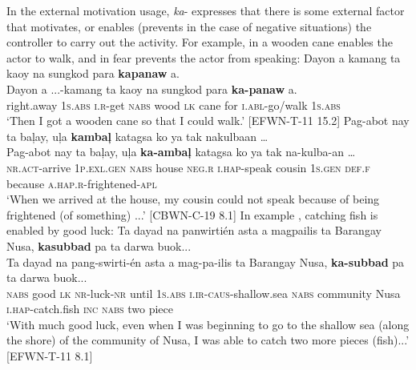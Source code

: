 In the external motivation usage, \textit{ka}- expresses that there is some external factor that motivates, or enables (prevents in the case of negative situations) the controller to carry out the activity. For example, in  a wooden cane enables the actor to walk, and in  fear prevents the actor from speaking: 
\ea
\label{bkm:Ref389056631}
Dayon  a   kamang   ta  kaoy  na  sungkod para  \textbf{kapanaw}  a. \\\smallskip
 \gll Dayon  a   ...-kamang\footnotemark{}   ta  kaoy  na  sungkod para  \textbf{ka-panaw}  a. \\
right.away  1\textsc{s.abs}  \textsc{i.r}-get  \textsc{nabs}  wood  \textsc{lk}  cane
for \textsc{i.abl}-go/walk  1\textsc{s.abs} \\
\glt `Then I got a wooden cane so that I could walk.’ [EFWN-T-11 15.2]
\z
\ea
\label{bkm:Ref396746244}
Pag-abot  nay  ta  baļay,  uļa  \textbf{kambaļ}  katagsa  ko ya tak  nakulbaan … \\\smallskip
 \gll Pag-abot  nay  ta  baļay,  uļa  \textbf{ka-ambaļ}  katagsa  ko ya tak  na-kulba-an … \\
\textsc{nr.act}-arrive  1\textsc{p.exl.gen}  \textsc{nabs}  house  \textsc{neg.r}  \textsc{i.hap}-speak  cousin  1\textsc{s.gen} \textsc{def.f}
because  \textsc{a.hap.r}-frightened-\textsc{apl} \\
\glt `When we arrived at the house, my cousin could not speak because of being frightened (of something) ...' [CBWN-C-19 8.1]
\z
In example , catching fish is enabled by good luck:  
\ea
\label{bkm:Ref396747208}
Ta  dayad  na  panwirtién  asta  a  magpailis ta  Barangay  Nusa,  \textbf{kasubbad}  pa  ta  darwa  buok... \\\smallskip
 \gll Ta  dayad  na  pang-swirti-én  asta  a  mag-pa-ilis ta  Barangay  Nusa,  \textbf{ka-subbad}  pa  ta  darwa  buok... \\
\textsc{nabs} good  \textsc{lk}  \textsc{nr}-luck-\textsc{nr}  until  1\textsc{s.abs}  \textsc{i.ir}-\textsc{caus}-shallow.sea
\textsc{nabs} community  Nusa  \textsc{i.hap}-catch.fish  \textsc{inc}  \textsc{nabs} two  piece \\
\glt `With much good luck, even when I was beginning to go to the shallow sea (along the shore) of the community of Nusa, I was able to catch two more pieces (fish)...’ [EFWN-T-11 8.1]
